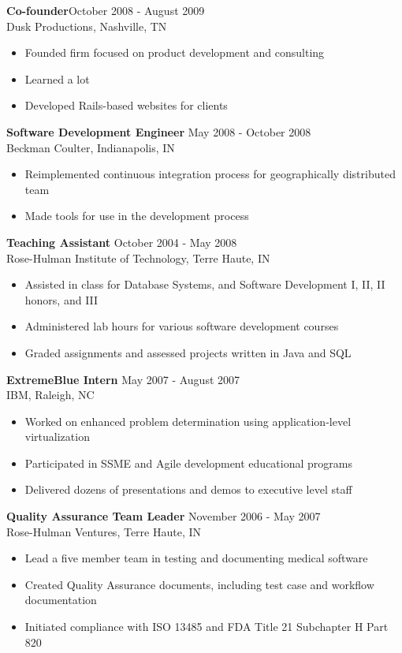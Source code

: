 \documentclass[line, margin, 10pt]{res}
\begin{document}
\begin{resume}
{\bf Co-founder}\hfill October 2008 - August 2009\\
Dusk Productions, Nashville, TN
\begin{itemize} \itemsep -2pt
\item Founded firm focused on product development and consulting
\item Learned a lot
\item Developed Rails-based websites for clients
\end{itemize}

{\bf Software Development Engineer} \hfill May 2008 - October 2008\\
Beckman Coulter, Indianapolis, IN
\begin{itemize} \itemsep -2pt
\item Reimplemented continuous integration process for geographically distributed team
\item Made tools for use in the development process
\end{itemize}

{\bf Teaching Assistant} \hfill October 2004 - May 2008\\
Rose-Hulman Institute of Technology, Terre Haute, IN
\begin{itemize} \itemsep -2pt
\item Assisted in class for Database Systems, and Software Development I, II, II honors, and III
\item Administered lab hours for various software development courses
\item Graded assignments and assessed projects written in Java and SQL
\end{itemize}

{\bf ExtremeBlue Intern} \hfill May 2007 - August 2007\\
IBM, Raleigh, NC
\begin{itemize} \itemsep -2pt
\item Worked on enhanced problem determination using application-level virtualization
\item Participated in SSME and Agile development educational programs
\item Delivered dozens of presentations and demos to executive level staff
\end{itemize}

{\bf Quality Assurance Team Leader} \hfill November 2006 - May 2007\\
Rose-Hulman Ventures, Terre Haute, IN
\begin{itemize} \itemsep -2pt
\item Lead a five member team in testing and documenting medical software
\item Created Quality Assurance documents, including test case and workflow documentation
\item Initiated compliance with ISO 13485 and FDA Title 21 Subchapter H Part 820
\end{itemize}


\end{resume}
\end{document}
